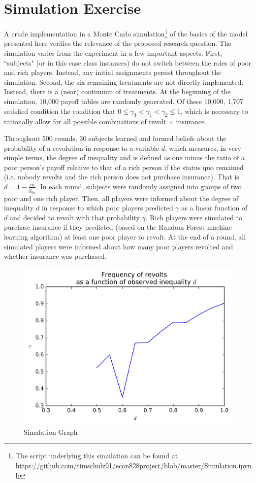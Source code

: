\documentclass[12pt]{article}
\begin{document}
	\section{Simulation Exercise}
	A crude implementation in a Monte Carlo simulation\footnote{The script 
	underlying this simulation can be found at 
	\url{https://github.com/timschulz91/econ828project/blob/master/Simulation.ipynb}}
	 of the basics of 
	the 
	model presented here verifies the relevance of the proposed research 
	question. The simulation varies from the experiment in a few important 
	aspects. First, ``subjects" (or in this case class instances) do not switch 
	between the roles of poor and rich players. Instead, any initial 
	assignments persist throughout the simulation. Second, the six remaining 
	treatments are not directly implemented. Instead, there is a (near) 
	continuum of treatments. At the beginning of the simulation, 10,000 payoff 
	tables are randomly generated. Of these 10,000, 1,707 satisfied condition 
	the condition that $0 \leq \gamma_3 < \gamma_1 < \gamma_2 \leq 1$, which is 
	necessary to rationally allow for all possible combinations of revolt 
	$\times$ insurance.
	
	Throughout 500 rounds, 30 subjects learned and formed beliefs about the 
	probability of a revolution in response to a variable $d$, which measures, 
	in very simple terms, the degree of inequality and is defined as one minus 
	the ratio of a poor person's payoff relative to that of a rich person if 
	the status quo remained (i.e. nobody revolts and the rich person does not 
	purchase insurance). That is $d=1-\frac{m}{y_{0n}}$. In each round, 
	subjects were randomly assigned into groups of two poor and one rich 
	player. Then, all players were informed about the degree of inequality $d$ 
	in response to which poor players predicted $\gamma$ as a linear function 
	of $d$ and decided to revolt with that probability $\gamma$. Rich players 
	were simulated to purchase insurance if they predicted (based on the Random 
	Forest machine learning algorithm) at least one poor player to revolt. At 
	the end of a round, all simulated players were informed about how many poor 
	players revolted and whether insurance was purchased.
	
	\begin{figure}[!htbp]
		\caption{Simulation Graph}
		\label{simgraph}
		\centering
		\includegraphics[width=.5\textwidth]{../graph.png}
	\end{figure}
	
\end{document}
